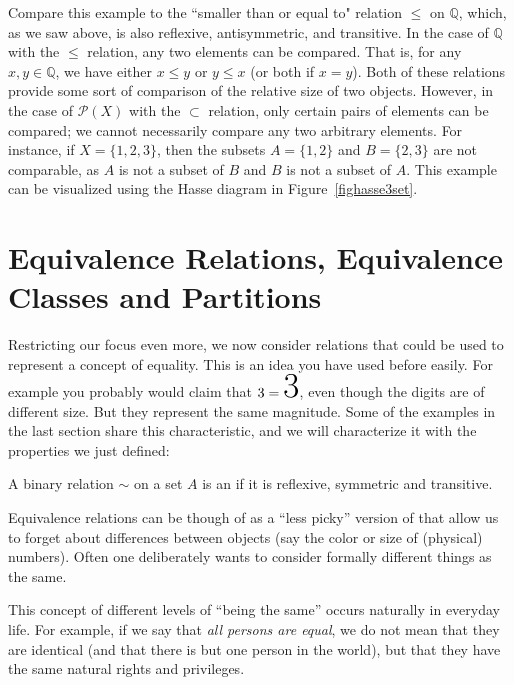 Compare this example to the ``smaller than or equal to" relation $\leq$ on $\mathbb{Q}$, which, as we saw above, is also reflexive, antisymmetric, and transitive.
In the case of $\mathbb{Q}$ with the $\leq$ relation, any two elements can be compared.
That is, for any $x,y \in \mathbb{Q}$, we have either $x \leq y$ or $y \leq x$ (or both if $x=y$).
Both of these relations provide some sort of comparison of the relative size of two objects.
However, in the case of $\mathcal{P}(X)$ with the $\subset$ relation, only certain pairs of elements can be compared; we cannot necessarily compare any two arbitrary elements.
For instance, if $X = \{ 1,2,3 \}$, then the subsets $A = \{ 1,2 \}$ and $B = \{ 2,3 \}$ are not comparable, as $A$ is not a subset of $B$ and $B$ is not a subset of $A$.
This example can be visualized using the Hasse diagram in 
Figure~\ref{fighasse3set}.

\section{Equivalence Relations, Equivalence Classes and Partitions}
\label{secequiv}

Restricting our focus even more,
we now consider relations that could be used to represent a concept of
equality. This is an idea
you have used before easily. For example you probably would
claim that $3=\mbox{\Huge 3}$, even though the digits are of different
size. But they represent the same magnitude. Some of the examples in the
last section share this characteristic, and we will characterize it with the
properties we just defined:
\begin{defn}
A binary relation $\sim$ on a set $A$ is an  if
it is reflexive, symmetric and transitive.
\end{defn}
Equivalence relations can be though of as a ``less picky'' version of
 that allow us to forget about differences between objects (say the
color or size  of (physical) numbers). Often one deliberately wants to
consider formally different things as the same. 

This concept of different levels of ``being the same'' occurs naturally in
everyday life. For example, if we say that {\em all persons are equal}, we do not
mean that they are identical (and that there is but one person in the world), but
that they have the same natural rights and privileges.

